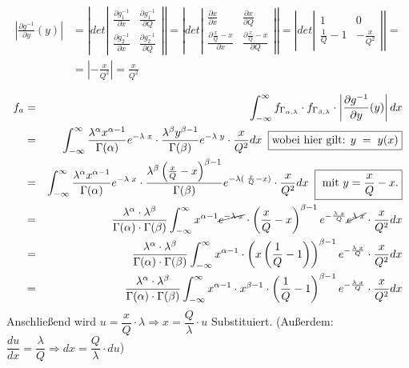 \begin{uebsp}
\begin{Answer}
\begin{align*}\left|\frac{\partial g^{-1}}{\partial y}(y)\right|&=\left|det\left|\begin{array}{cc}\frac{\partial g_1^{-1}}{\partial x} & \frac{\partial g_1^{-1}}{\partial Q} \\ \frac{\partial g_2^{-1}}{\partial x} & \frac{\partial g_2^{-1}}{\partial Q} \end{array}\right|\right| = \left|det\left|\begin{array}{cc}\frac{\partial x}{\partial x} & \frac{\partial x}{\partial Q} \\ \frac{\partial \frac{x}{Q}-x}{\partial x} & \frac{\partial \frac{x}{Q}-x}{\partial Q} \end{array}\right|\right| = \left|det\left|\begin{array}{cc}1 & 0 \\ \frac{1}{Q}-1 & -\frac{x}{Q^2} \end{array}\right|\right|=\\
&=\left|-\frac{x}{Q^2}\right|=\frac{x}{Q^2}
\end{align*}

\begin{eqnarray*}
f_a &=& \int_{-\infty}^\infty f_{\Gamma_{\alpha, \lambda}}\cdot f_{\Gamma_{\beta, \lambda}}\cdot \left|\frac{\partial g^{-1}}{\partial y}(y)\right| dx\\
 &=& \int_{-\infty}^\infty \frac{\lambda^\alpha x^{\alpha-1}}{\Gamma(\alpha)}e^{-\lambda\; x} \cdot \frac{\lambda^\beta y^{\beta-1}}{\Gamma(\beta)}e^{-\lambda\; y}\cdot \frac{x}{Q^2} dx \;\;\fbox{wobei hier gilt: $y\;=\;y(x)$}\\
 &=& \int_{-\infty}^\infty \frac{\lambda^\alpha x^{\alpha-1}}{\Gamma(\alpha)}e^{-\lambda\; x} \cdot \frac{\lambda^\beta \left(\frac{x}{Q}-x\right)^{\beta-1}}{\Gamma(\beta)}e^{-\lambda(\; \frac{x}{Q}-x)}\cdot \frac{x}{Q^2} dx \;\;\fbox{ mit $y=\dfrac{x}{Q}-x$.}\\
 &=& \frac{\lambda^\alpha\cdot \lambda^\beta}{\Gamma(\alpha)\cdot \Gamma(\beta)}\int_{-\infty}^\infty x^{\alpha-1}\cancel{e^{-\lambda\; x}} \cdot \left(\frac{x}{Q}-x\right)^{\beta-1}e^{-\frac{\lambda\;x}{Q}}\cancel{e^{\lambda\;x}}\cdot \frac{x}{Q^2} dx\\
 &=& \frac{\lambda^\alpha\cdot \lambda^\beta}{\Gamma(\alpha)\cdot \Gamma(\beta)}\int_{-\infty}^\infty x^{\alpha-1} \cdot \left(x\left(\frac{1}{Q}-1\right)\right)^{\beta-1}e^{-\frac{\lambda\;x}{Q}}\cdot \frac{x}{Q^2} dx\\
 &=& \frac{\lambda^\alpha\cdot \lambda^\beta}{\Gamma(\alpha)\cdot \Gamma(\beta)}\int_{-\infty}^\infty x^{\alpha-1} \cdot x^{\beta-1}\cdot \left(\frac{1}{Q}-1\right)^{\beta-1}e^{-\frac{\lambda\;x}{Q}}\cdot \frac{x}{Q^2} dx\\
\end{eqnarray*}
Anschließend wird $u=\dfrac{x}{Q}\cdot \lambda\Rightarrow x=\dfrac{Q}{\lambda}\cdot u$ Substituiert. (Außerdem: $\dfrac{du}{dx}=\dfrac{\lambda}{Q}\Rightarrow dx=\dfrac{Q}{\lambda}\cdot du$)


\end{Answer}
\end{uebsp}
